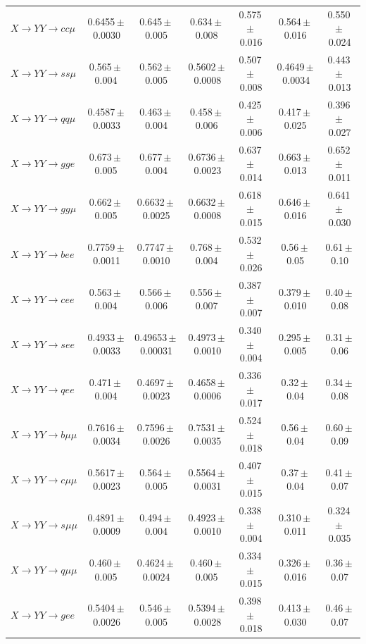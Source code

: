 \begin{landscape}
{\begin{longtable}{@{\extracolsep{\fill}}lcccccc@{}}
$X\to YY\to cc\mu$ & 0.6455\,$\pm$\,0.0030 & 0.645\,$\pm$\,0.005 & 0.634\,$\pm$\,0.008 & 0.575\,$\pm$\,0.016 & 0.564\,$\pm$\,0.016 & 0.550\,$\pm$\,0.024 \\
$X\to YY\to ss\mu$ & 0.565\,$\pm$\,0.004 & 0.562\,$\pm$\,0.005 & 0.5602\,$\pm$\,0.0008 & 0.507\,$\pm$\,0.008 & 0.4649\,$\pm$\,0.0034 & 0.443\,$\pm$\,0.013 \\
$X\to YY\to qq\mu$ & 0.4587\,$\pm$\,0.0033 & 0.463\,$\pm$\,0.004 & 0.458\,$\pm$\,0.006 & 0.425\,$\pm$\,0.006 & 0.417\,$\pm$\,0.025 & 0.396\,$\pm$\,0.027 \\
$X\to YY\to gge$ & 0.673\,$\pm$\,0.005 & 0.677\,$\pm$\,0.004 & 0.6736\,$\pm$\,0.0023 & 0.637\,$\pm$\,0.014 & 0.663\,$\pm$\,0.013 & 0.652\,$\pm$\,0.011 \\
$X\to YY\to gg\mu$ & 0.662\,$\pm$\,0.005 & 0.6632\,$\pm$\,0.0025 & 0.6632\,$\pm$\,0.0008 & 0.618\,$\pm$\,0.015 & 0.646\,$\pm$\,0.016 & 0.641\,$\pm$\,0.030 \\
\midrule
$X\to YY\to bee$ & 0.7759\,$\pm$\,0.0011 & 0.7747\,$\pm$\,0.0010 & 0.768\,$\pm$\,0.004 & 0.532\,$\pm$\,0.026 & 0.56\,$\pm$\,0.05 & 0.61\,$\pm$\,0.10 \\
$X\to YY\to cee$ & 0.563\,$\pm$\,0.004 & 0.566\,$\pm$\,0.006 & 0.556\,$\pm$\,0.007 & 0.387\,$\pm$\,0.007 & 0.379\,$\pm$\,0.010 & 0.40\,$\pm$\,0.08 \\
$X\to YY\to see$ & 0.4933\,$\pm$\,0.0033 & 0.49653\,$\pm$\,0.00031 & 0.4973\,$\pm$\,0.0010 & 0.340\,$\pm$\,0.004 & 0.295\,$\pm$\,0.005 & 0.31\,$\pm$\,0.06 \\
$X\to YY\to qee$ & 0.471\,$\pm$\,0.004 & 0.4697\,$\pm$\,0.0023 & 0.4658\,$\pm$\,0.0006 & 0.336\,$\pm$\,0.017 & 0.32\,$\pm$\,0.04 & 0.34\,$\pm$\,0.08 \\
$X\to YY\to b\mu\mu$ & 0.7616\,$\pm$\,0.0034 & 0.7596\,$\pm$\,0.0026 & 0.7531\,$\pm$\,0.0035 & 0.524\,$\pm$\,0.018 & 0.56\,$\pm$\,0.04 & 0.60\,$\pm$\,0.09 \\
$X\to YY\to c\mu\mu$ & 0.5617\,$\pm$\,0.0023 & 0.564\,$\pm$\,0.005 & 0.5564\,$\pm$\,0.0031 & 0.407\,$\pm$\,0.015 & 0.37\,$\pm$\,0.04 & 0.41\,$\pm$\,0.07 \\
$X\to YY\to s\mu\mu$ & 0.4891\,$\pm$\,0.0009 & 0.494\,$\pm$\,0.004 & 0.4923\,$\pm$\,0.0010 & 0.338\,$\pm$\,0.004 & 0.310\,$\pm$\,0.011 & 0.324\,$\pm$\,0.035 \\
$X\to YY\to q\mu\mu$ & 0.460\,$\pm$\,0.005 & 0.4624\,$\pm$\,0.0024 & 0.460\,$\pm$\,0.005 & 0.334\,$\pm$\,0.015 & 0.326\,$\pm$\,0.016 & 0.36\,$\pm$\,0.07 \\
$X\to YY\to gee$ & 0.5404\,$\pm$\,0.0026 & 0.546\,$\pm$\,0.005 & 0.5394\,$\pm$\,0.0028 & 0.398\,$\pm$\,0.018 & 0.413\,$\pm$\,0.030 & 0.46\,$\pm$\,0.07 \\

\end{longtable}}
\end{landscape}
